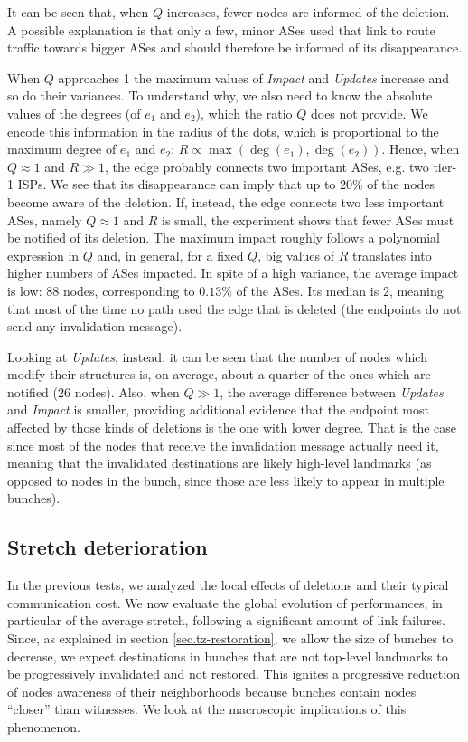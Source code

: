 \documentclass[a4paper,11pt,oneside]{report}
\begin{document}
It can be seen that, when $Q$ increases, fewer nodes are informed of the deletion. A possible explanation is that only a few, minor ASes used that link to route traffic towards bigger ASes and should therefore be informed of its disappearance.

When $Q$ approaches 1 the maximum values of \textit{Impact} and \textit{Updates} increase and so do their variances. To understand why, we also need to know the absolute values of the degrees (of $e_1$ and $e_2$), which the ratio $Q$ does not provide. We encode this information in the radius of the dots, which is proportional to the maximum degree of $e_1$ and $e_2$: $R \propto \max(\deg(e_1), \deg(e_2))$.
Hence, when $Q \approx 1$ and $R \gg 1$, the edge probably connects two important ASes, e.g. two tier-1 ISPs. We see that its disappearance can imply that up to $20\%$ of the nodes become aware of the deletion. If, instead, the edge connects two less important ASes, namely $Q \approx 1$ and $R$ is small, the experiment shows that fewer ASes must be notified of its deletion. The maximum impact roughly follows a polynomial expression in $Q$ and, in general, for a fixed $Q$, big values of $R$ translates into higher numbers of ASes impacted.
In spite of a high variance, the average impact is low: $88$ nodes, corresponding to $0.13\%$ of the ASes. Its median is $2$, meaning that most of the time no path used the edge that is deleted (the endpoints do not send any invalidation message).

Looking at \textit{Updates}, instead, it can be seen that the number of nodes which modify their structures is, on average, about a quarter of the ones which are notified ($26$ nodes). Also, when $Q \gg 1$, the average difference between \textit{Updates} and \textit{Impact} is smaller, providing additional evidence that the endpoint most affected by those kinds of deletions is the one with lower degree. That is the case since most of the nodes that receive the invalidation message actually need it, meaning that the invalidated destinations are likely high-level landmarks (as opposed to nodes in the bunch, since those are less likely to appear in multiple bunches).

\subsection{Stretch deterioration}
In the previous tests, we analyzed the local effects of deletions and their typical communication cost. We now evaluate the global evolution of performances, in particular of the average stretch, following a significant amount of link failures. Since, as explained in section \ref{sec.tz-restoration}, we allow the size of bunches to decrease, we expect destinations in bunches that are not top-level landmarks to be progressively invalidated and not restored. This ignites a progressive reduction of nodes awareness of their neighborhoods because bunches contain nodes ``closer'' than witnesses. We look at the macroscopic implications of this phenomenon.
\end{document}
